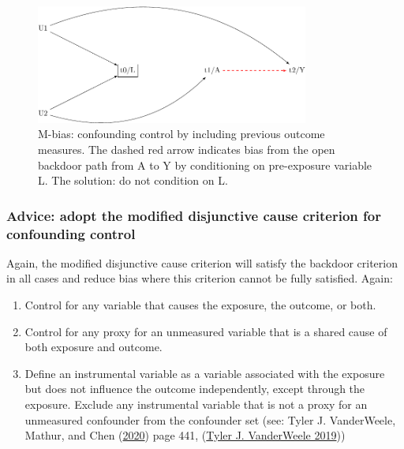 \documentclass[
  singlecolumn]{article}
\providecommand{\tightlist}{%
  \setlength{\itemsep}{0pt}\setlength{\parskip}{0pt}}\usepackage{longtable,booktabs,array}
\begin{document}
\begin{figure}

{\centering \includegraphics[width=0.8\textwidth,height=\textheight]{causal-dags_files/figure-pdf/fig-m-bias-1.pdf}

}

\caption{\label{fig-m-bias}M-bias: confounding control by including
previous outcome measures. The dashed red arrow indicates bias from the
open backdoor path from A to Y by conditioning on pre-exposure variable
L. The solution: do not condition on L.}

\end{figure}

\hypertarget{advice-adopt-the-modified-disjunctive-cause-criterion-for-confounding-control}{%
\subsubsection{Advice: adopt the modified disjunctive cause criterion
for confounding
control}\label{advice-adopt-the-modified-disjunctive-cause-criterion-for-confounding-control}}

Again, the modified disjunctive cause criterion will satisfy the
backdoor criterion in all cases and reduce bias where this criterion
cannot be fully satisfied. Again:

\begin{enumerate}
\def\labelenumi{\alph{enumi}.}
\tightlist
\item
  Control for any variable that causes the exposure, the outcome, or
  both.
\item
  Control for any proxy for an unmeasured variable that is a shared
  cause of both exposure and outcome.
\item
  Define an instrumental variable as a variable associated with the
  exposure but does not influence the outcome independently, except
  through the exposure. Exclude any instrumental variable that is not a
  proxy for an unmeasured confounder from the confounder set (see: Tyler
  J. VanderWeele, Mathur, and Chen
  (\protect\hyperlink{ref-vanderweele2020}{2020}) page 441,
  (\protect\hyperlink{ref-vanderweele2019}{Tyler J. VanderWeele 2019}))
\end{enumerate}
\end{document}
